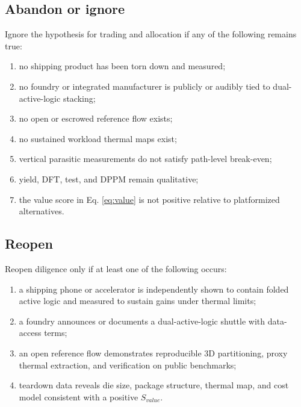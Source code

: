 \documentclass[11pt]{article}
\begin{document}
\subsection{Abandon or ignore}
Ignore the hypothesis for trading and allocation if any of the following remains true:
\begin{enumerate}
  \item no shipping product has been torn down and measured;
  \item no foundry or integrated manufacturer is publicly or audibly tied to dual-active-logic stacking;
  \item no open or escrowed reference flow exists;
  \item no sustained workload thermal maps exist;
  \item vertical parasitic measurements do not satisfy path-level break-even;
  \item yield, DFT, test, and DPPM remain qualitative;
  \item the value score in Eq. \ref{eq:value} is not positive relative to platformized alternatives.
\end{enumerate}

\subsection{Reopen}
Reopen diligence only if at least one of the following occurs:
\begin{enumerate}
  \item a shipping phone or accelerator is independently shown to contain folded active logic and measured to sustain gains under thermal limits;
  \item a foundry announces or documents a dual-active-logic shuttle with data-access terms;
  \item an open reference flow demonstrates reproducible 3D partitioning, proxy thermal extraction, and verification on public benchmarks;
  \item teardown data reveals die size, package structure, thermal map, and cost model consistent with a positive $S_{value}$.
\end{enumerate}
\end{document}
